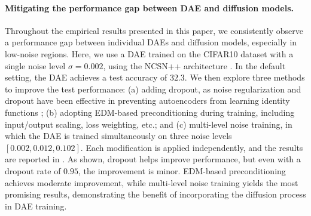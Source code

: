 
\paragraph{Mitigating the performance gap between DAE and diffusion models.}
Throughout the empirical results presented in this paper, we consistently observe a performance gap between individual DAEs and diffusion models, especially in low-noise regions. Here, we use a DAE trained on the CIFAR10 dataset with a single noise level $\sigma = 0.002$, using the NCSN++ architecture \citep{karras2022elucidating}. In the default setting, the DAE achieves a test accuracy of $32.3$. We then explore three methods to improve the test performance: (a) adding dropout, as noise regularization and dropout have been effective in preventing autoencoders from learning identity functions \citep{steck2020autoencoders}; (b) adopting EDM-based preconditioning during training, including input/output scaling, loss weighting, etc.; and (c) multi-level noise training, in which the DAE is trained simultaneously on three noise levels $[0.002, 0.012, 0.102]$. Each modification is applied independently, and the results are reported in . As shown, dropout helps improve performance, but even with a dropout rate of $0.95$, the improvement is minor. EDM-based preconditioning achieves moderate improvement, while multi-level noise training yields the most promising results, demonstrating the benefit of incorporating the diffusion process in DAE training.

